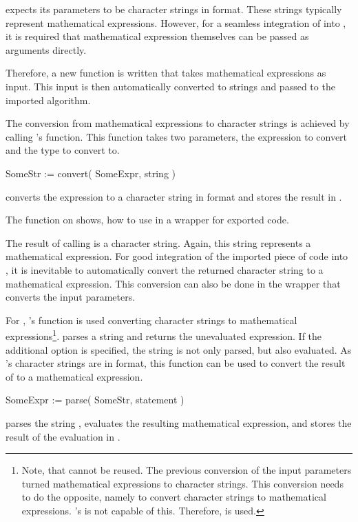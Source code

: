 \exportedsymbol expects its parameters to be character strings in \C format. These strings typically represent mathematical expressions. However, for a seamless integration of \exportedsymbol into \Maple, it is required that mathematical expression themselves can be passed as arguments directly.

Therefore, a new function is written that takes mathematical expressions as input. This input is then automatically converted to strings and passed to the imported \Aldor algorithm.

The conversion from mathematical expressions to character strings is achieved by calling \Maple's  function. This function takes two parameters, the expression to convert and the type to convert to.

\begin{mapleprogram}
SomeStr := convert( SomeExpr, string )
\end{mapleprogram}
converts the expression  to a character string in \C format and stores the result in .

The function  on  shows, how to use  in a wrapper for exported code.

The result of calling \exportedsymbol is a character string. Again, this string represents a mathematical expression. For good integration of the imported piece of code into \Maple, it is inevitable to automatically convert the returned character string to a mathematical expression. This conversion can also be done in the wrapper that converts the input parameters.

For \LibCharSet, \Maple's  function is used converting character strings to mathematical expressions\footnote{Note, that  cannot be reused. The previous conversion of the input parameters turned mathematical expressions to character strings. This conversion needs to do the opposite, namely to convert character strings to mathematical expressions. \Maple's  is not capable of this. Therefore,  is used.}.  parses a string and returns the unevaluated expression. If the additional option  is specified, the string is not only parsed, but also evaluated. As \Maple's character strings are in \C format, this function can be used to convert the result of \exportedsymbol to a mathematical expression.

\begin{mapleprogram}
SomeExpr := parse( SomeStr, statement )
\end{mapleprogram}
parses the string , evaluates the resulting mathematical expression, and stores the result of the evaluation in .

